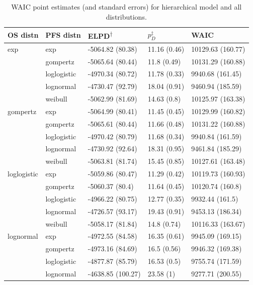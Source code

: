 \documentclass[AMA,STIX1COL]{WileyNJD-v2}
\begin{document}
\begin{table}[!ht]
\centering
\caption{WAIC point estimates (and standard errors) for hierarchical model and all distributions. \label{tab:waic_hier}}
\begin{tabular}{l|l|l|l|l}
\hline
\textbf{OS distn} & \textbf{PFS distn} & \textbf{ELPD\textsuperscript{$\dagger$}} & \textbf{$p_D^{\ddagger}$} & \textbf{WAIC} \\
\hline
exp & exp & -5064.82 (80.38) & 11.16 (0.46) & 10129.63 (160.77)\\
\hline
 & gompertz & -5065.64 (80.44) & 11.8 (0.49) & 10131.29 (160.88)\\
\hline
 & loglogistic & -4970.34 (80.72) & 11.78 (0.33) & 9940.68 (161.45)\\
\hline
 & lognormal & -4730.47 (92.79) & 18.04 (0.91) & 9460.94 (185.59)\\
\hline
 & weibull & -5062.99 (81.69) & 14.63 (0.8) & 10125.97 (163.38)\\
\hline
gompertz & exp & -5064.99 (80.41) & 11.45 (0.45) & 10129.99 (160.82)\\
\hline
 & gompertz & -5065.61 (80.44) & 11.66 (0.48) & 10131.22 (160.88)\\
\hline
 & loglogistic & -4970.42 (80.79) & 11.68 (0.34) & 9940.84 (161.59)\\
\hline
 & lognormal & -4730.92 (92.64) & 18.31 (0.95) & 9461.84 (185.29)\\
\hline
 & weibull & -5063.81 (81.74) & 15.45 (0.85) & 10127.61 (163.48)\\
\hline
loglogistic & exp & -5059.86 (80.47) & 11.29 (0.42) & 10119.73 (160.93)\\
\hline
 & gompertz & -5060.37 (80.4) & 11.64 (0.45) & 10120.74 (160.8)\\
\hline
 & loglogistic & -4966.22 (80.75) & 12.77 (0.35) & 9932.44 (161.5)\\
\hline
 & lognormal & -4726.57 (93.17) & 19.43 (0.91) & 9453.13 (186.34)\\
\hline
 & weibull & -5058.17 (81.84) & 14.8 (0.74) & 10116.33 (163.67)\\
\hline
lognormal & exp & -4972.55 (84.58) & 16.35 (0.61) & 9945.09 (169.15)\\
\hline
 & gompertz & -4973.16 (84.69) & 16.5 (0.56) & 9946.32 (169.38)\\
\hline
 & loglogistic & -4877.87 (85.79) & 16.53 (0.5) & 9755.74 (171.59)\\
\hline
 & lognormal & -4638.85 (100.27) & 23.58 (1) & 9277.71 (200.55)\\

\end{tabular}
\end{table}
\end{document}
